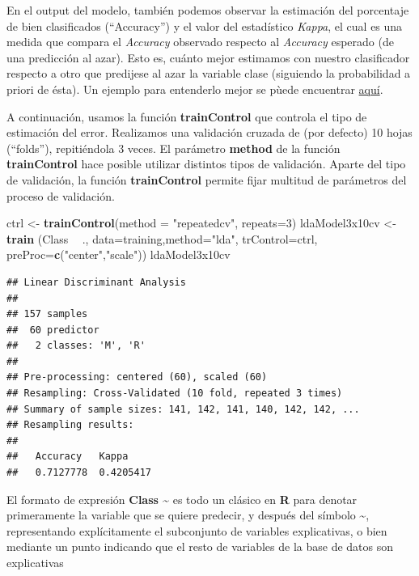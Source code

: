 \documentclass[
]{article}
\newenvironment{Shaded}{\begin{snugshade}}{\end{snugshade}}
\newcommand{\DataTypeTok}[1]{\textcolor[rgb]{0.13,0.29,0.53}{#1}}
\newcommand{\DecValTok}[1]{\textcolor[rgb]{0.00,0.00,0.81}{#1}}
\newcommand{\KeywordTok}[1]{\textcolor[rgb]{0.13,0.29,0.53}{\textbf{#1}}}
\newcommand{\NormalTok}[1]{#1}
\newcommand{\OperatorTok}[1]{\textcolor[rgb]{0.81,0.36,0.00}{\textbf{#1}}}
\newcommand{\StringTok}[1]{\textcolor[rgb]{0.31,0.60,0.02}{#1}}
\begin{document}
En el output del modelo, también podemos observar la estimación del
porcentaje de bien clasificados (``Accuracy'') y el valor del
estadístico \emph{Kappa}, el cual es una medida que compara el
\emph{Accuracy} observado respecto al \emph{Accuracy} esperado (de una
predicción al azar). Esto es, cuánto mejor estimamos con nuestro
clasificador respecto a otro que predijese al azar la variable clase
(siguiendo la probabilidad a priori de ésta). Un ejemplo para entenderlo
mejor se pùede encuentrar
\href{https://stats.stackexchange.com/questions/82162/cohens-kappa-in-plain-english}{aquí}.

A continuación, usamos la función \textbf{trainControl} que controla el
tipo de estimación del error. Realizamos una validación cruzada de (por
defecto) 10 hojas (``folds''), repitiéndola 3 veces. El parámetro
\textbf{method} de la función \textbf{trainControl} hace posible
utilizar distintos tipos de validación. Aparte del tipo de validación,
la función \textbf{trainControl} permite fijar multitud de parámetros
del proceso de validación.

\begin{Shaded}
\begin{Highlighting}[]
\NormalTok{ctrl <-}\StringTok{ }\KeywordTok{trainControl}\NormalTok{(}\DataTypeTok{method =} \StringTok{"repeatedcv"}\NormalTok{, }\DataTypeTok{repeats=}\DecValTok{3}\NormalTok{)}
\NormalTok{ldaModel3x10cv <-}\StringTok{ }\KeywordTok{train}\NormalTok{ (Class }\OperatorTok{~}\StringTok{ }\NormalTok{., }\DataTypeTok{data=}\NormalTok{training,}\DataTypeTok{method=}\StringTok{"lda"}\NormalTok{, }\DataTypeTok{trControl=}\NormalTok{ctrl, }
                         \DataTypeTok{preProc=}\KeywordTok{c}\NormalTok{(}\StringTok{"center"}\NormalTok{,}\StringTok{"scale"}\NormalTok{))}
\NormalTok{ldaModel3x10cv}
\end{Highlighting}
\end{Shaded}

\begin{verbatim}
## Linear Discriminant Analysis 
## 
## 157 samples
##  60 predictor
##   2 classes: 'M', 'R' 
## 
## Pre-processing: centered (60), scaled (60) 
## Resampling: Cross-Validated (10 fold, repeated 3 times) 
## Summary of sample sizes: 141, 142, 141, 140, 142, 142, ... 
## Resampling results:
## 
##   Accuracy   Kappa    
##   0.7127778  0.4205417
\end{verbatim}

El formato de expresión \textbf{Class \textasciitilde{}} es todo un
clásico en \textbf{R} para denotar primeramente la variable que se
quiere predecir, y después del símbolo \textbf{\textasciitilde{}},
representando explícitamente el subconjunto de variables explicativas, o
bien mediante un punto indicando que el resto de variables de la base de
datos son explicativas
\end{document}
